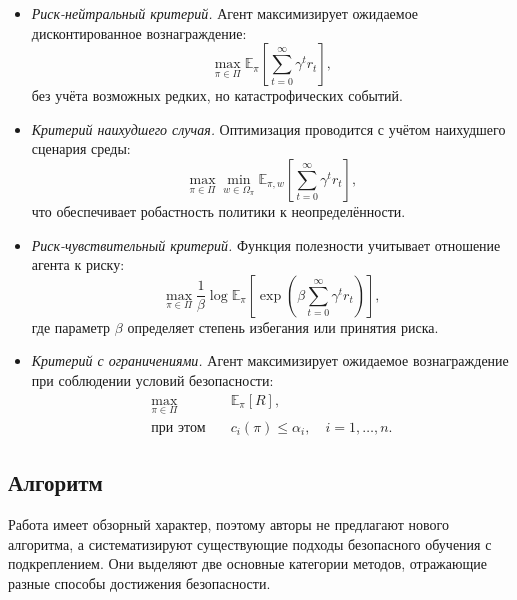 \begin{itemize}

    \item \emph{Риск-нейтральный критерий.}  
    Агент максимизирует ожидаемое дисконтированное вознаграждение:
    \begin{equation}
    \max_{\pi \in \Pi} \mathbb{E}_{\pi}\left[\sum_{t=0}^{\infty} \gamma^t r_t \right],
    \end{equation}
    без учёта возможных редких, но катастрофических событий.

    \item \emph{Критерий наихудшего случая.}  
    Оптимизация проводится с учётом наихудшего сценария среды:
    \begin{equation}
    \max_{\pi \in \Pi} \min_{w \in \Omega_\pi} \mathbb{E}_{\pi, w}\left[\sum_{t=0}^{\infty} \gamma^t r_t \right],
    \end{equation}
    что обеспечивает робастность политики к неопределённости.

    \item \emph{Риск-чувствительный критерий.}  
    Функция полезности учитывает отношение агента к риску:
    \begin{equation}
    \max_{\pi \in \Pi} \frac{1}{\beta} \log \mathbb{E}_{\pi}\left[\exp\left(\beta \sum_{t=0}^{\infty} \gamma^t r_t\right)\right],
    \end{equation}
    где параметр $\beta$ определяет степень избегания или принятия риска.

    \item \emph{Критерий с ограничениями.}  
    Агент максимизирует ожидаемое вознаграждение при соблюдении условий безопасности:
    \begin{equation}
    \begin{aligned}
    \max_{\pi \in \Pi} & \quad \mathbb{E}_{\pi}[R], \\
    \text{при этом} & \quad c_i(\pi) \leq \alpha_i, \quad i = 1,\dots,n.
    \end{aligned}
    \end{equation}

\end{itemize}

\subsection{Алгоритм}

Работа имеет обзорный характер, поэтому авторы не предлагают нового алгоритма, а систематизируют существующие подходы безопасного обучения с подкреплением.  
Они выделяют две основные категории методов, отражающие разные способы достижения безопасности.

